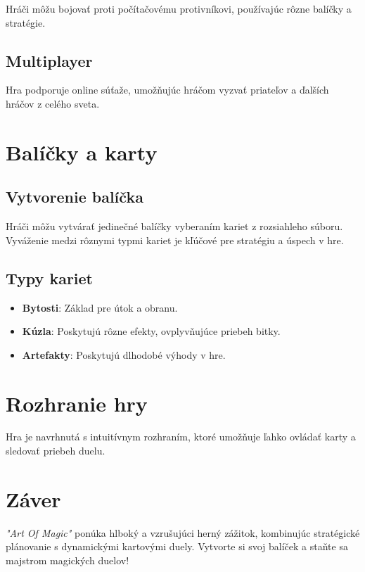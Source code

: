 \documentclass[12pt]{article}
\begin{document}
Hráči môžu bojovať proti počítačovému protivníkovi, používajúc rôzne balíčky a stratégie.

\subsection{Multiplayer}

Hra podporuje online súťaže, umožňujúc hráčom vyzvať priateľov a ďalších hráčov z celého sveta.

\section{Balíčky a karty}

\subsection{Vytvorenie balíčka}

Hráči môžu vytvárať jedinečné balíčky vyberaním kariet z rozsiahleho súboru. Vyváženie medzi rôznymi typmi kariet je kľúčové pre stratégiu a úspech v hre.

\subsection{Typy kariet}

\begin{itemize}
    \item \textbf{Bytosti}: Základ pre útok a obranu.
    \item \textbf{Kúzla}: Poskytujú rôzne efekty, ovplyvňujúce priebeh bitky.
    \item \textbf{Artefakty}: Poskytujú dlhodobé výhody v hre.
\end{itemize}

\section{Rozhranie hry}

Hra je navrhnutá s intuitívnym rozhraním, ktoré umožňuje ľahko ovládať karty a sledovať priebeh duelu.

\section{Záver}

\textit{"Art Of Magic"} ponúka hlboký a vzrušujúci herný zážitok, kombinujúc stratégické plánovanie s dynamickými kartovými duely. Vytvorte si svoj balíček a staňte sa majstrom magických duelov!
\end{document}
